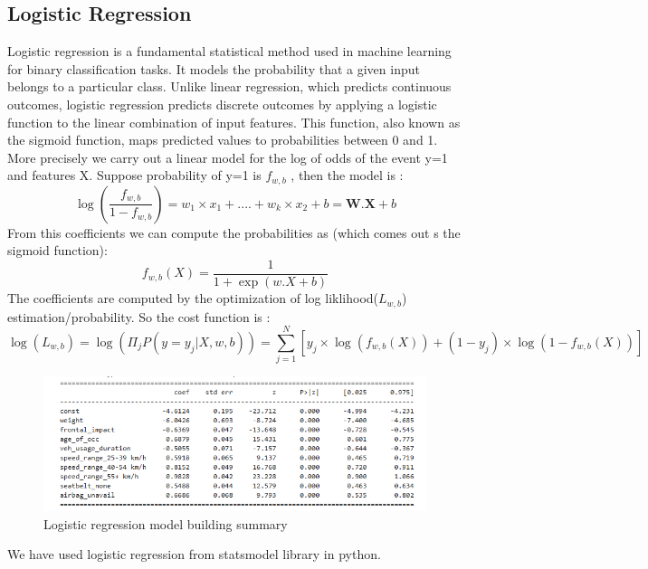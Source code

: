 \documentclass[12pt,a4paper]{article}
\begin{document}
	\subsection{Logistic Regression}
	Logistic regression is a fundamental statistical method used in machine learning for binary classification tasks. It models the probability that a given input belongs to a particular class. Unlike linear regression, which predicts continuous outcomes, logistic regression predicts discrete outcomes by applying a logistic function to the linear combination of input features. This function, also known as the sigmoid function, maps predicted values to probabilities between 0 and 1.
	More precisely we carry out a linear model for the log of odds of the event y=1 and features X. Suppose probability of y=1 is $f_{w,b}$ , then the model is :
	\begin{equation}
		\log{\left(\frac{f_{w,b}}{1-f_{w,b}}\right)} = w_1\times x_1 + .... + w_k\times x_2 + b = \boldsymbol{W.X} + b
	\end{equation} 
	From this coefficients  we can compute the probabilities as (which comes out s the sigmoid function):
	\begin{equation}
		f_{w,b}(X)=\frac{1}{1+\exp{(w.X+b)}}
	\end{equation}
	The coefficients are computed by the optimization of log liklihood($L_{w,b}$) estimation/probability. So the cost function is :
	\begin{equation}
		\log{(L_{w,b})} = \log(\Pi_j P(y=y_j|X, w, b)) = \sum_{j=1}^{N}\left[ y_j\times \log(f_{w,b}(X)) + (1-y_j)\times \log(1-f_{w,b}(X))  \right] 
	\end{equation}
	\begin{figure}[h]
		\centering
		\includegraphics[width=0.8\linewidth]{lg2_summary.png}
		\caption{Logistic regression model building summary}
		\label{fig:lg2_summary}
	\end{figure}
	We have used logistic regression from statsmodel library in python. 
\end{document}
